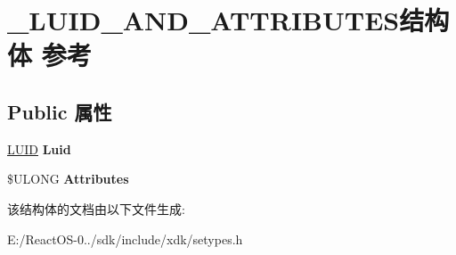 \hypertarget{struct___l_u_i_d___a_n_d___a_t_t_r_i_b_u_t_e_s}{}\section{\+\_\+\+L\+U\+I\+D\+\_\+\+A\+N\+D\+\_\+\+A\+T\+T\+R\+I\+B\+U\+T\+E\+S结构体 参考}
\label{struct___l_u_i_d___a_n_d___a_t_t_r_i_b_u_t_e_s}
\subsection*{Public 属性}
\begin{DoxyCompactItemize}
\item 
\mbox{\label{struct___l_u_i_d___a_n_d___a_t_t_r_i_b_u_t_e_s_a87ba6ddd98dbc6cb4af380e69d31233a}} 
\hyperlink{struct___l_u_i_d}{L\+U\+ID} {\bfseries Luid}
\item 
\mbox{\label{struct___l_u_i_d___a_n_d___a_t_t_r_i_b_u_t_e_s_a00d658f0ba03672a63e60acac25f7be6}} 
\$U\+L\+O\+NG {\bfseries Attributes}
\end{DoxyCompactItemize}


该结构体的文档由以下文件生成\+:\begin{DoxyCompactItemize}
\item 
E\+:/\+React\+O\+S-\/0../sdk/include/xdk/setypes.\+h\end{DoxyCompactItemize}
